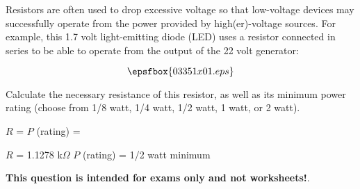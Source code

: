 

Resistors are often used to drop excessive voltage so that low-voltage devices may successfully operate from the power provided by high(er)-voltage sources.  For example, this 1.7 volt light-emitting diode (LED) uses a resistor connected in series to be able to operate from the output of the 22 volt generator:

$$\epsfbox{03351x01.eps}$$

Calculate the necessary resistance of this resistor, as well as its minimum power rating (choose from 1/8 watt, 1/4 watt, 1/2 watt, 1 watt, or 2 watt).

\vskip 10pt

$R$ = \hskip 140pt $P$ (rating) = 







$R$ = 1.1278 k$\Omega$ \hskip 100pt $P$ (rating) = 1/2 watt minimum







{\bf This question is intended for exams only and not worksheets!}.



